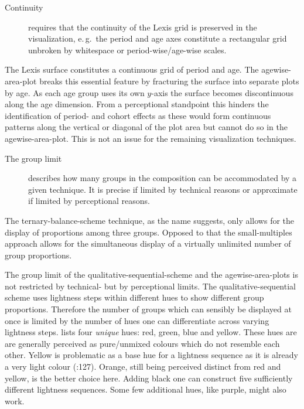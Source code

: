 \documentclass[parskip=half]{scrartcl}
\begin{document}
\begin{description}
  \item[Continuity] requires that the continuity of the Lexis grid is preserved in the visualization, e.\,g.~the period and age axes constitute a rectangular grid unbroken by whitespace or period-wise/age-wise scales.
\end{description}

The Lexis surface constitutes a continuous grid of period and age. The agewise-area-plot breaks this essential feature by fracturing the surface into separate plots by age. As each age group uses its own $y$-axis the surface becomes discontinuous along the age dimension. From a perceptional standpoint this hinders the identification of period- and cohort effects as these would form continuous patterns along the vertical or diagonal of the plot area but cannot do so in the agewise-area-plot. This is not an issue for the remaining visualization techniques.

\begin{description}
  \item[The group limit] describes how many groups in the composition can be accommodated by a given technique. It is precise if limited by technical reasons or approximate if limited by perceptional reasons.
\end{description}

The ternary-balance-scheme technique, as the name suggests, only allows for the display of proportions among three groups. Opposed to that the small-multiples approach allows for the simultaneous display of a virtually unlimited number of group proportions.

The group limit of the qualitative-sequential-scheme and the agewise-area-plots is not restricted by technical- but by perceptional limits. The qualitative-sequential scheme uses lightness steps within different hues to show different group proportions. Therefore the number of groups which can sensibly be displayed at once is limited by the number of hues one can differentiate across varying lightness steps. \textcite{Ware2013} lists four \emph{unique} hues: red, green, blue and yellow. These hues are are generally perceived as pure/unmixed colours which do not resemble each other. Yellow is problematic as a base hue for a lightness sequence as it is already a very light colour (\cite{Ware2013}:127). Orange, still being perceived distinct from red and yellow, is the better choice here. Adding black one can construct five sufficiently different lightness sequences. Some few additional hues, like purple, might also work.
\end{document}
